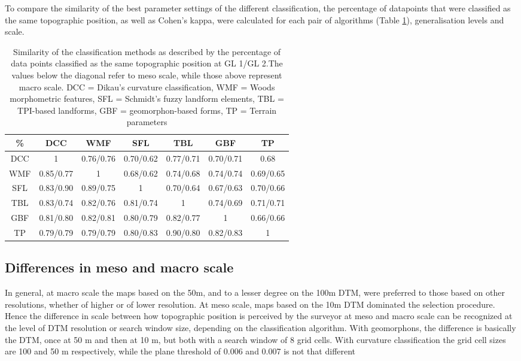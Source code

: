 \documentclass[final,1p,times,twocolumn,authoryear]{elsarticle}
\begin{document}
To compare the similarity of the best parameter settings of the different classification, the percentage of datapoints that were classified as the same topographic position, as well as Cohen's kappa, were calculated for each pair of algorithms (Table \ref{table:similarity_matrix}), generalisation levels and scale. 
\begin{table}[ht]
\caption{Similarity of the classification methods as described by the percentage of data points classified as the same topographic position at GL 1/GL 2.The values below the diagonal refer to meso scale, while those above represent macro scale. DCC = Dikau's curvature classification, WMF = Woods morphometric features, SFL = Schmidt's fuzzy landform elements, TBL = TPI-based landforms, GBF = geomorphon-based forms, TP = Terrain parameters}
\centering
\begin{tabular}{ccccccc}
  \hline
\%  & DCC & WMF &SFL &TBL & GBF & TP \\ 
  \hline
DCC &1 & 0.76/0.76 & 0.70/0.62 & 0.77/0.71 & 0.70/0.71 & 0.68 \\ 
WMF &0.85/0.77  & 1 & 0.68/0.62 & 0.74/0.68 & 0.74/0.74 & 0.69/0.65 \\ 
SFL & 0.83/0.90 & 0.89/0.75 & 1 & 0.70/0.64 & 0.67/0.63 & 0.70/0.66 \\ 
TBL & 0.83/0.74 &0.82/0.76  &0.81/0.74  & 1 & 0.74/0.69 & 0.71/0.71 \\ 
GBF &0.81/0.80  &0.82/0.81  & 0.80/0.79  & 0.82/0.77 & 1 & 0.66/0.66 \\ 
TP &0.79/0.79  &0.79/0.79  &0.80/0.83  &0.90/0.80  &0.82/0.83  & 1 \\ 
   \hline
\end{tabular}
\label{table:similarity_matrix}
\end{table}

\subsection{Differences in meso and macro scale } 
In general, at macro scale the maps based on the 50m, and to a lesser degree on the 100m DTM, were preferred to those based on other resolutions, whether of higher or of lower resolution. At meso scale, maps based on the 10m DTM dominated the selection procedure. Hence the difference in scale between how topographic position is perceived by the surveyor at meso and macro scale can be recognized at the level of DTM resolution or search window size, depending on the classification algorithm.
With geomorphons, the difference is basically the DTM, once at 50 m and then at 10 m, but both with a search window of 8 grid cells. With curvature classification the grid cell sizes are 100 and 50 m respectively, while the plane threshold of 0.006 and 0.007 is not that different
\end{document}
